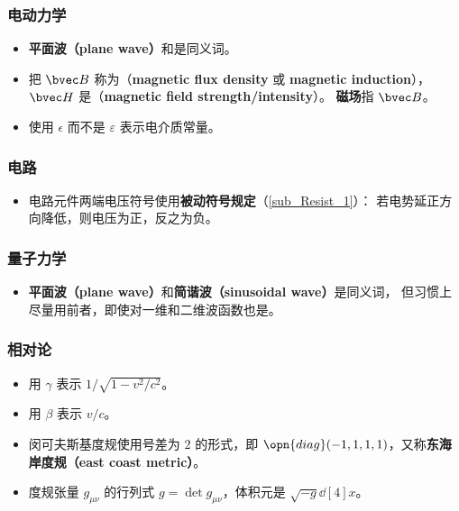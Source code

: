 \subsubsection{电动力学}
\begin{itemize}
\item \textbf{平面波（plane wave）}和是同义词。
\item 把 $\bvec B$ 称为（\textbf{magnetic flux density} 或 \textbf{magnetic induction}）， $\bvec H$ 是（\textbf{magnetic field strength/intensity}）。 \textbf{磁场}指 $\bvec B$。
\item 使用 $\epsilon$ 而不是 $\varepsilon$ 表示电介质常量。
\end{itemize}

\subsubsection{电路}
\begin{itemize}
\item 电路元件两端电压符号使用\textbf{被动符号规定}（\autoref{sub_Resist_1}）： 若电势延正方向降低，则电压为正，反之为负。
\end{itemize}

\subsubsection{量子力学}
\begin{itemize}
\item \textbf{平面波（plane wave）}和\textbf{简谐波（sinusoidal wave）}是同义词， 但习惯上尽量用前者，即使对一维和二维波函数也是。
\end{itemize}

\subsubsection{相对论}
\begin{itemize}
\item 用 $\gamma$ 表示 $1/\sqrt{1 - v^2/c^2}$。
\item 用 $\beta$ 表示 $v/c$。
\item 闵可夫斯基度规使用号差为 $2$ 的形式，即 $\opn{diag}(-1, 1, 1, 1)$，又称\textbf{东海岸度规（east coast metric）}。
\item 度规张量 $g_{\mu\nu}$ 的行列式 $g = \det g_{\mu\nu}$，体积元是 $\sqrt{- g} \dd[4]{x}$。
\end{itemize}

